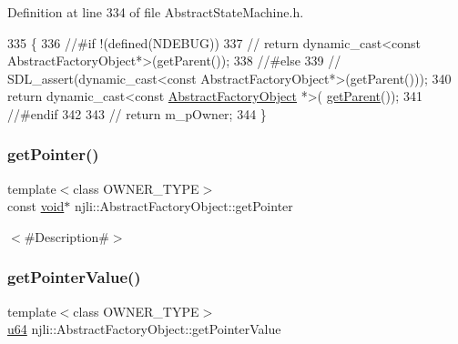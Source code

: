 Definition at line 334 of file Abstract\+State\+Machine.\+h.


\begin{DoxyCode}
335   \{
336     \textcolor{comment}{//#if !(defined(NDEBUG))}
337     \textcolor{comment}{//    return dynamic\_cast<const AbstractFactoryObject*>(getParent());}
338     \textcolor{comment}{//#else}
339     \textcolor{comment}{//    SDL\_assert(dynamic\_cast<const AbstractFactoryObject*>(getParent()));}
340     \textcolor{keywordflow}{return} \textcolor{keyword}{dynamic\_cast<}\textcolor{keyword}{const }\mbox{\hyperlink{classnjli_1_1_abstract_factory_object_a4f7ae7bf09c7c9426e7d6023f7fd8dec}{AbstractFactoryObject}} *\textcolor{keyword}{>}(
      \mbox{\hyperlink{classnjli_1_1_abstract_decorator_a02e7976cdd7bcc8852e2e6b6dcc5b7ac}{getParent}}());
341     \textcolor{comment}{//#endif}
342 
343     \textcolor{comment}{//        return m\_pOwner;}
344   \}
\end{DoxyCode}
\mbox{\label{classnjli_1_1_abstract_state_machine_ac4ca71716ed832be357f15f8262c8448}} 
\subsubsection{\texorpdfstring{get\+Pointer()}{getPointer()}}
{\footnotesize\ttfamily template$<$class O\+W\+N\+E\+R\+\_\+\+T\+Y\+PE$>$ \\
const \mbox{\hyperlink{_thread_8h_af1e856da2e658414cb2456cb6f7ebc66}{void}}$\ast$ njli\+::\+Abstract\+Factory\+Object\+::get\+Pointer}

$<$\#\+Description\#$>$ \mbox{\label{classnjli_1_1_abstract_state_machine_a4ffddf141a426a5a07d0ac19f1913811}} 
\subsubsection{\texorpdfstring{get\+Pointer\+Value()}{getPointerValue()}}
{\footnotesize\ttfamily template$<$class O\+W\+N\+E\+R\+\_\+\+T\+Y\+PE$>$ \\
\mbox{\hyperlink{_util_8h_ad758b7a5c3f18ed79d2fcd23d9f16357}{u64}} njli\+::\+Abstract\+Factory\+Object\+::get\+Pointer\+Value}

